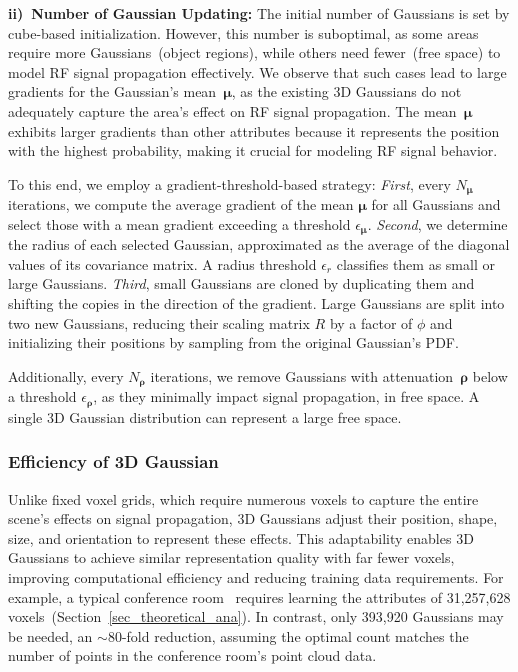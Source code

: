 \textbf{ii)~Number of Gaussian Updating:}
The initial number of Gaussians is set by cube-based initialization.  
However, this number is suboptimal, as some areas require more Gaussians~(\eg object regions), while others need fewer~(\eg free space) to model RF signal propagation effectively.
We observe that such cases lead to large gradients for the Gaussian's mean~\(\boldsymbol{\mu}\), as the existing 3D Gaussians do not adequately capture the area's effect on RF signal propagation.  
The mean~\(\boldsymbol{\mu}\) exhibits larger gradients than other attributes because it represents the position with the highest probability, making it crucial for modeling RF signal behavior.



To this end, we employ a gradient-threshold-based strategy: 
\textit{First}, every \(N_{\boldsymbol{\mu}}\) iterations, we compute the average gradient of the mean \(\boldsymbol{\mu}\) for all Gaussians and select those with a mean gradient exceeding a threshold \(\epsilon_{\boldsymbol{\mu}}\).  
\textit{Second}, we determine the radius of each selected Gaussian, approximated as the average of the diagonal values of its covariance matrix.  
A radius threshold \(\epsilon_{r}\) classifies them as small or large Gaussians.
\textit{Third}, small Gaussians are cloned by duplicating them and shifting the copies in the direction of the gradient.
Large Gaussians are split into two new Gaussians, reducing their scaling matrix \(R\) by a factor of \(\phi\) and initializing their positions by sampling from the original Gaussian's PDF.

Additionally, every \(N_{\boldsymbol{\rho}}\) iterations, we remove Gaussians with attenuation~\(\boldsymbol{\rho}\) below a threshold \(\epsilon_{\boldsymbol{\rho}}\), as they minimally impact signal propagation, \eg in free space.  
A single 3D Gaussian distribution can represent a large free space.




\subsubsection{Efficiency of 3D Gaussian}\label{sec_design_gaussian}


Unlike fixed voxel grids, which require numerous voxels to capture the entire scene's effects on signal propagation, 3D Gaussians adjust their position, shape, size, and orientation to represent these effects.  
This adaptability enables 3D Gaussians to achieve similar representation quality with far fewer voxels, improving computational efficiency and reducing training data requirements.
For example, a typical conference room~\cite{matlab_conference_room} requires learning the attributes of 31,257,628 voxels~(Section~\ref{sec_theoretical_ana}).  
In contrast, only 393,920 Gaussians may be needed, an \(\mathord{\sim}80\)-fold reduction, assuming the optimal count matches the number of points in the conference room's point cloud data. 





